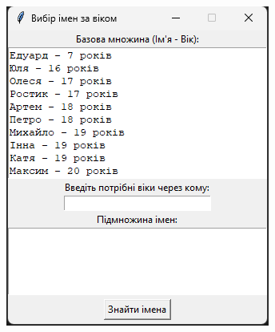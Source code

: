 \documentclass[12pt,a4paper]{article}
\begin{document}
    \begin{figure}[htbp]
        \begin{subfigure}{0.33\textwidth}
            \includegraphics[width=\linewidth]{ex0.png}
            \label{fig1:a}
        \end{subfigure}
        \begin{subfigure}{0.33\textwidth}

\end{subfigure}
\end{figure}
\end{document}
